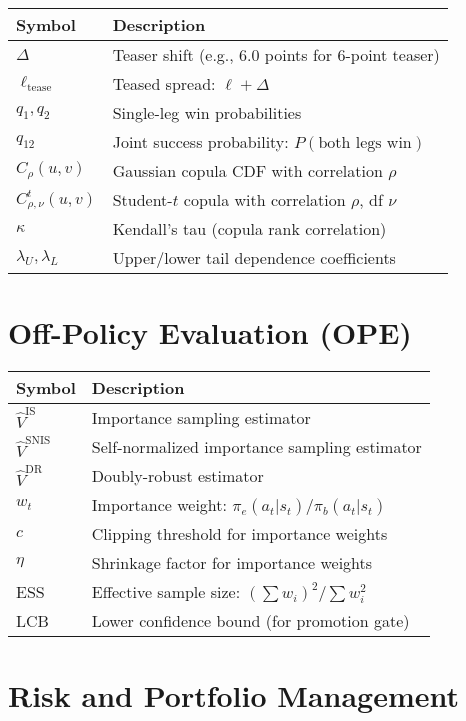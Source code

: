 \begin{tabular}{ll}
\toprule
\textbf{Symbol} & \textbf{Description} \\
\midrule
$\Delta$ & Teaser shift (e.g., 6.0 points for 6-point teaser) \\
$\ell_{\text{tease}}$ & Teased spread: $\ell + \Delta$ \\
$q_1, q_2$ & Single-leg win probabilities \\
$q_{12}$ & Joint success probability: $P(\text{both legs win})$ \\
$C_{\rho}(u,v)$ & Gaussian copula CDF with correlation $\rho$ \\
$C_{\rho,\nu}^t(u,v)$ & Student-$t$ copula with correlation $\rho$, df $\nu$ \\
$\kappa$ & Kendall's tau (copula rank correlation) \\
$\lambda_U, \lambda_L$ & Upper/lower tail dependence coefficients \\
\bottomrule
\end{tabular}

\section*{Off-Policy Evaluation (OPE)}

\begin{tabular}{ll}
\toprule
\textbf{Symbol} & \textbf{Description} \\
\midrule
$\hat{V}^{\text{IS}}$ & Importance sampling estimator \\
$\hat{V}^{\text{SNIS}}$ & Self-normalized importance sampling estimator \\
$\hat{V}^{\text{DR}}$ & Doubly-robust estimator \\
$w_t$ & Importance weight: $\pi_e(a_t|s_t) / \pi_b(a_t|s_t)$ \\
$c$ & Clipping threshold for importance weights \\
$\eta$ & Shrinkage factor for importance weights \\
ESS & Effective sample size: $(\sum w_i)^2 / \sum w_i^2$ \\
LCB & Lower confidence bound (for promotion gate) \\
\bottomrule
\end{tabular}

\section*{Risk and Portfolio Management}

